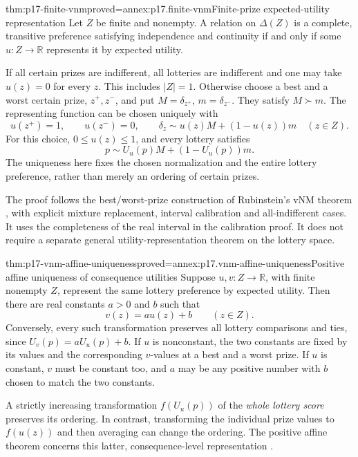 \begin{hbtheorem}{thm:p17-finite-vnm}{proved=annex:p17.finite-vnm}{Finite-prize expected-utility representation}
Let \(Z\) be finite and nonempty. A relation on \(\Delta(Z)\) is a
complete, transitive preference satisfying independence and continuity
if and only if some \(u:Z\to\mathbb R\) represents it by expected utility.

If all certain prizes are indifferent, all lotteries are indifferent and
one may take \(u(z)=0\) for every \(z\). This includes \(|Z|=1\).
Otherwise choose a best and a worst certain prize, \(z^+,z^-\), and
put \(M=\delta_{z^+}\), \(m=\delta_{z^-}\). They satisfy \(M\succ m\).
The representing function can be chosen uniquely with
\[
 u(z^+)=1,\qquad u(z^-)=0,\qquad
       \delta_z\sim u(z)M+(1-u(z))m\quad(z\in Z).
\]
For this choice, \(0\leq u(z)\leq1\), and every lottery satisfies
\[
                  p\sim U_u(p)M+(1-U_u(p))m.
\]
The uniqueness here fixes the chosen normalization and the entire
lottery preference, rather than merely an ordering of certain prizes.
\end{hbtheorem}

The proof follows the best/worst-prize construction of Rubinstein's vNM
theorem \cite[pp.~99--100]{Rubinstein2015LectureNotes}, with explicit
mixture replacement, interval calibration and all-indifferent cases.
It uses the completeness of the real interval in the calibration proof.
It does not require a separate general utility-representation theorem on
the lottery space.

\begin{hbtheorem}{thm:p17-vnm-affine-uniqueness}{proved=annex:p17.vnm-affine-uniqueness}{Positive affine uniqueness of consequence utilities}
Suppose \(u,v:Z\to\mathbb R\), with finite nonempty \(Z\), represent
the same lottery preference by expected utility. Then there are real
constants \(a>0\) and \(b\) such that
\[
                           v(z)=a u(z)+b\qquad(z\in Z).
\]
Conversely, every such transformation preserves all lottery comparisons
and ties, since \(U_v(p)=aU_u(p)+b\).
If \(u\) is nonconstant, the two constants are fixed by its values and
the corresponding \(v\)-values at a best and a worst prize. If \(u\)
is constant, \(v\) must be constant too, and \(a\) may be any positive
number with \(b\) chosen to match the two constants.
\end{hbtheorem}

A strictly increasing transformation \(f(U_u(p))\) of the \emph{whole lottery
score} preserves its ordering. In contrast, transforming the individual
prize values to \(f(u(z))\) and then averaging can change the ordering.
The positive affine theorem concerns this latter, consequence-level
representation \cite[p.~100]{Rubinstein2015LectureNotes}.

